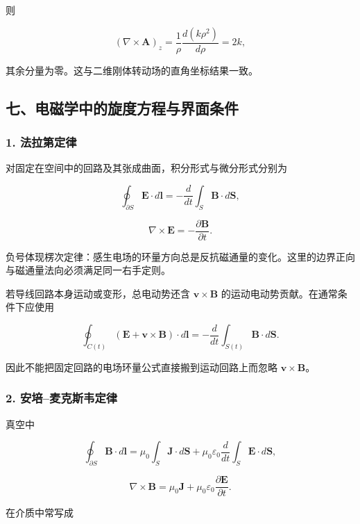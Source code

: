 则

\[
(\nabla\times\mathbf A)_z
=
\frac1\rho\frac{d(k\rho^2)}{d\rho}
=2k,
\]

其余分量为零。这与二维刚体转动场的直角坐标结果一致。

\subsection{七、电磁学中的旋度方程与界面条件}\label{m1:ux4e03ux7535ux78c1ux5b66ux4e2dux7684ux65cbux5ea6ux65b9ux7a0bux4e0eux754cux9762ux6761ux4ef6}

\subsubsection{1. 法拉第定律}\label{m1:ux6cd5ux62c9ux7b2cux5b9aux5f8b}

对固定在空间中的回路及其张成曲面，积分形式与微分形式分别为

\[
\boxed{
\oint_{\partial S}\mathbf E\cdot d\mathbf l
=
-\frac{d}{dt}\int_S\mathbf B\cdot d\mathbf S
},
\]

\[
\boxed{
\nabla\times\mathbf E
=
-\frac{\partial\mathbf B}{\partial t}
}.
\]

负号体现楞次定律：感生电场的环量方向总是反抗磁通量的变化。这里的边界正向与磁通量法向必须满足同一右手定则。

若导线回路本身运动或变形，总电动势还含 \(\mathbf v\times\mathbf B\)
的运动电动势贡献。在通常条件下应使用

\[
\oint_{C(t)}
\left(
\mathbf E+\mathbf v\times\mathbf B
\right)\cdot d\mathbf l
=-\frac d{dt}
\int_{S(t)}\mathbf B\cdot d\mathbf S.
\]

因此不能把固定回路的电场环量公式直接搬到运动回路上而忽略
\(\mathbf v\times\mathbf B\)。

\subsubsection{2.
安培--麦克斯韦定律}\label{m1:ux5b89ux57f9ux9ea6ux514bux65afux97e6ux5b9aux5f8b}

真空中

\[
\boxed{
\oint_{\partial S}\mathbf B\cdot d\mathbf l
=
\mu_0\int_S\mathbf J\cdot d\mathbf S
+\mu_0\varepsilon_0
\frac{d}{dt}\int_S\mathbf E\cdot d\mathbf S
},
\]

\[
\boxed{
\nabla\times\mathbf B
=
\mu_0\mathbf J
+\mu_0\varepsilon_0
\frac{\partial\mathbf E}{\partial t}
}.
\]

在介质中常写成

